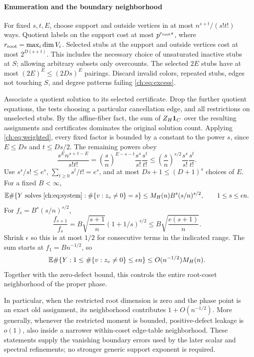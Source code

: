 \paragraph{Enumeration and the boundary neighborhood}
For fixed $s,t,E$, choose support and outside vertices in at most $n^{s+t}/(s!t!)$ ways. Quotient labels on the support cost at most $p^{r_{\rm root}s}$, where $r_{\rm root}=\max_i\dim V_i$. Selected stubs at the support and outside vertices cost at most $2^{D(s+t)}$. This includes the necessary choice of unsaturated inactive stubs at $S$; allowing arbitrary subsets only overcounts. The selected $2E$ stubs have at most $(2E)^E\le(2Ds)^E$ pairings. Discard invalid colors, repeated stubs, edges not touching $S$, and degree patterns failing \eqref{ch:eq:excess}.

Associate a quotient solution to its selected certificate. Drop the further quotient equations, the tests choosing a particular cancellation edge, and all restrictions on unselected stubs. By the affine-fiber fact, the sum of $Z_H\mathbf 1_C$ over the resulting assignments and certificates dominates the original solution count. Applying \eqref{ch:eq:weighted}, every fixed factor is bounded by a constant to the power $s$, since $E\le Ds$ and $t\le Ds/2$. The remaining powers obey
\begin{equation}\label{ch:eq:powers}
 \frac{s^E n^{s+t-E}}{s!t!}
 =\left(\frac{s}{n}\right)^{E-s-t}\frac{s^s}{s!}\frac{s^t}{t!}
 \le\left(\frac{s}{n}\right)^{s/2}\frac{s^s}{s!}\frac{s^t}{t!}.
\end{equation}
Use $s^s/s!\le e^s$, $\sum_{t\ge0}s^t/t!=e^s$, and at most $Ds+1\le(D+1)^s$ choices of $E$. For a fixed $B<\infty$,
\begin{equation}\label{ch:eq:boundary}
 \mathbb E\#\{Y\text{ solves \eqref{ch:eq:system}}:\#\{v:z_v\ne0\}=s\}
 \le M_H(n)B^s(s/n)^{s/2},\qquad1\le s\le\epsilon n.
\end{equation}
For $f_s=B^s(s/n)^{s/2}$,
\[
 \frac{f_{s+1}}{f_s}
 =B\sqrt{\frac{s+1}{n}}(1+1/s)^{s/2}
 \le B\sqrt{\frac{e(s+1)}n}.
\]
Shrink $\epsilon$ so this is at most $1/2$ for consecutive terms in the indicated range. The sum starts at $f_1=B n^{-1/2}$, so
\begin{equation}\label{ch:eq:boundarysum}
 \mathbb E\#\{Y:1\le\#\{v:z_v\ne0\}\le\epsilon n\}
 \le O(n^{-1/2})M_H(n).
\end{equation}
Together with the zero-defect bound, this controls the entire root-coset neighborhood of the proper phase.

In particular, when the restricted root dimension is zero and the
phase point is an exact old assignment, its neighborhood contributes
$1+O(n^{-1/2})$. More generally, whenever the restricted moment is
bounded, positive-defect leakage is $o(1)$, also inside a narrower
within-coset edge-table neighborhood. These statements supply the
vanishing boundary errors used by the later scalar and spectral
refinements; no stronger generic support exponent is required.


